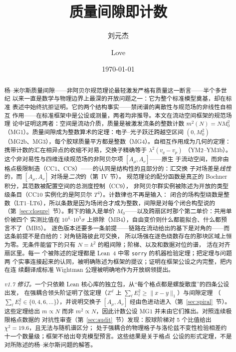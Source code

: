 \documentclass[aps,prd,preprint,superscriptaddress,amsmath,amssymb]{revtex4-2}
\begin{document}
\title{质量间隙即计数}

\author{刘元杰}
\author{Love}

\date{\today}

\begin{abstract}
杨--米尔斯质量间隙——非阿贝尔规范理论最轻激发严格有质量这一断言——半个多世纪
以来一直是数学与物理边界上最深的开放问题之一：它为整个标准模型奠基，却在标准
表述中始终抗拒证明。它的两个结构事实——禁闭谱的离散性与规范场的非线性自相互
作用——在标准框架中是公设或测量，两者均非推导。本文在流动空间框架的规范场理
论中证明这两者：空间是流动介质，质量是被激发流条的整数计数 $m^2(N)=N M_0^2$
（MG1）。质量间隙成为整数算术的定理：电子--光子跃迁跨越空区间 $(0,M_0^2)$
（MG2b、MG3），每个胶球质量平方都是整数（MG4）。自相互作用成为几何的定理：
携带计数的汇在相异点的收缩不对易，交换子精确等于 $\lambda^2(v_q-v_p)$
（YM2--YM3b）。这个非对易性与四维连续规范场的非阿贝尔项 $[A_\mu,A_\nu]$——原生
于流动空间，而非由格点极限制造（CC1、CC8）——的认同是结构性的且部分的：汇交换
子对场差是\emph{线性}的，而 $[A_\mu,A_\nu]$ 对场是\emph{二次}的（第~IV 节）。
规范理论的配分函数是真正的 Bochner 积分，其范数被配置空间的总测度控制（CC9），
非阿贝尔群实例被陈述为开放的类型级条目（CC10 实例化的是阿贝尔 $T^4$）。计数律也不再是输入：
闭合的场构型绕数是整数（LT1--LT6），所以条数是因为场闭合才成为整数，间隙是对每个闭合构型说的
（第~\ref{sec:closure}~节）。剩下的输入是单价 $M_0$——以及跨扇区时那个第二单价：共用单价被四个
实测比值在 $10^4$--$10^5\sigma$ 上排除（MB4），自由变价则什么都能拟合、什么都预言不了（MB5）。
逐色版本还要多一条前提——链路在流动给出的基下是对角的——而这条前提不是白给的：对角链路彼此可交换，
所以场强在逐色绕数存在的那块区域上恒为零。无条件能留下的只有 $N=k^2$ 的粗间隙；阶梯、以及和数据对位的谱，
活在对齐扇区里。每一
个被陈述的定理都是 Lean~4 中零 \texttt{sorry} 的机器检验定理；把定理与问题两
个实事连接起来的认同，被明确陈述为框架的提议；证明在框架公设之内完整，把内在连
续翻译成标准 Wightman 公理被明确地作为开放纲领提出。

\emph{v1.7 修订。}一个只依赖 Lean 核心库的独立包，从``每个格点都是螺旋散度''的四条公设出发，
在强耦合领头阶证明了弦定理（$\mathbb{Z}^d$ 上 $\sum_\ell E_\ell^2\ge\|x-y\|_1$）与间隙定理
（$\sum_\ell E_\ell^2\in\{0,4,6,\dots\}$），并说明交换子 $[A_\mu,A_\nu]$ 经由色进动进入（第~\ref{sec:spiral}~节）。
这些定理给出 $m\propto N$ 而非 $m^2\propto N$，因此计数公设 MG1 并未由它们推出。对照连续极限格点数据的
对抗性审查（第~\ref{sec:audit}~节）发现：胶球阶梯对 5 个比值给出 $\chi^2=19.6$，且无法与随机谱区分；
处于强耦合的物理格子与洛伦兹不变性检验相差约十一个数量级；框架不给出夸克模型预言。这些结果是关于格点
公设的形式定理，不是对所陈述的杨--米尔斯问题的解答。
\end{abstract}
\end{document}
